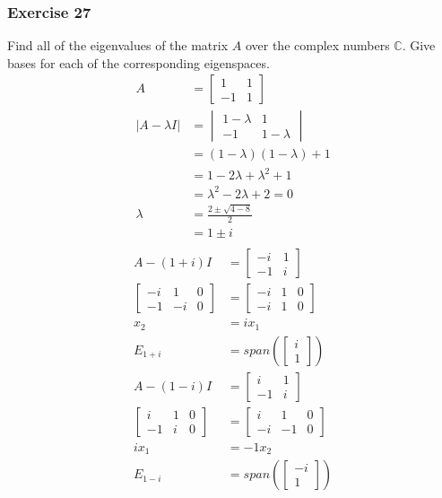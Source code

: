 \documentclass{math}
\begin{document}
\subsubsection*{Exercise 27}
Find all of the eigenvalues of the matrix \( A \) over the complex numbers
\( \mathbb{C} \). Give bases for each of the corresponding eigenspaces.
\begin{align*}
  A &= \begin{bmatrix}1 & 1 \\ -1 & 1\end{bmatrix} \\
  |A-\lambda I| &= \begin{vmatrix}
    1-\lambda & 1 \\
    -1 & 1-\lambda
  \end{vmatrix} \\
  &= (1-\lambda)(1-\lambda)+1 \\
  &= 1-2\lambda+\lambda^2+1 \\
  &= \lambda^2-2\lambda+2 = 0 \\
  \lambda &= \frac{2\pm\sqrt{4-8}}{2} \\
  &= 1\pm i \\
\end{align*}
\begin{align*}
  A-(1+i)I &= \begin{bmatrix} -i & 1 \\ -1 & i \end{bmatrix} \\
  \left[\begin{array}{cc|c}
    -i & 1 & 0 \\
    -1 & -i & 0
  \end{array}\right] &= \begin{bmatrix}
    -i & 1 & 0 \\
    -i & 1 & 0
  \end{bmatrix} \\
  x_2 &= ix_1 \\
  E_{1+i} &= span\left(\begin{bmatrix}i \\ 1\end{bmatrix}\right) \\
  A-(1-i)I &= \begin{bmatrix} i & 1 \\ -1 & i \end{bmatrix} \\
  \left[\begin{array}{cc|c}
    i & 1 & 0 \\
    -1 & i & 0
  \end{array}\right] &= \begin{bmatrix}
    i & 1 & 0 \\
    -i & -1 & 0
  \end{bmatrix} \\
  ix_1 &= -1x_2 \\
  E_{1-i} &= span\left(\begin{bmatrix}-i \\ 1\end{bmatrix}\right)
\end{align*}
\end{document}
